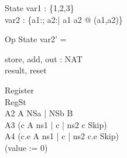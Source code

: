 \documentclass{llncs}
\begin{document}
\begin{schema}{State}
var1 : \power \{1,2,3\}\\
var2 : \{a1:\nat; a2:\nat | a1 \neq a2 @ (a1,a2)\}
\end{schema}
\begin{schema}{Op}
\Delta State
\where
var2' = \emptyset
\end{schema}


\begin{circus}
\circchannel store, add, out : NAT\\
\circchannel result, reset\\
\end{circus}
\begin{circus}
\circprocess Register \circdef\\
	\circbegin \circstate RegSt \\
	A2 \circdef A \linter NSa | NSb \rinter B\\
	A3 \circdef (c \then A \lpar ns1 | \lchanset c \rchanset | ns2 \rpar c \then Skip)\\
	A4 \circdef (c.e \then A \lpar ns1 | \lchanset c \rchanset | ns2 \rpar c.e \then Skip)\\
	\circspot (value := 0) \\
	\circend\\
\end{circus}
\end{document}
